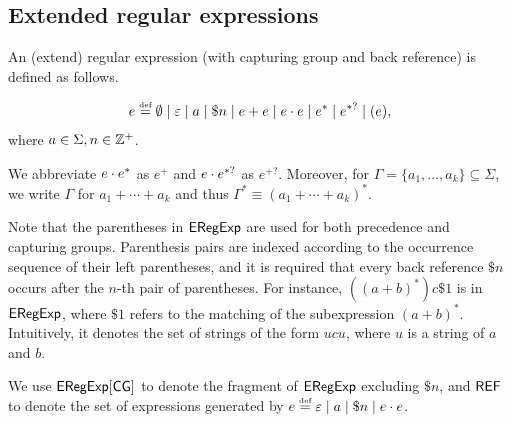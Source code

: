   
 \subsection{Extended regular expressions}
An (extend) regular expression (with capturing group and back reference) is defined as follows.
  
\begin{definition}
  	\[e \eqdef \emptyset \mid \varepsilon \mid a \mid \$n \mid e + e \mid e \concat e \mid e^* \mid e^{*?} \mid (e)  , \]
  	where $a \in \Sigma, n \in \mathbb{Z}^+$. 
\end{definition}
We abbreviate $e \cdot e^*$ as $e^+$ and $e \cdot e^{*?}$ as $e^{+?}$. Moreover, for $\Gamma = \{a_1, \ldots, a_k\}\subseteq \Sigma$, we write $\Gamma$ for  $a_1 + \cdots + a_k$ and thus  $\Gamma^\ast \equiv (a_1 + \cdots + a_k)^\ast$. 

Note that the parentheses in ${\sf ERegExp}$ are used for both precedence and capturing groups. 
%
Parenthesis pairs are indexed according to the occurrence sequence of their left parentheses, and it is required that every back reference $\$ n$ occurs  %
after the $n$-th pair of parentheses. For instance, $((a+b)^*) c \$1$ is in ${\sf ERegExp}$, where $\$1$ refers to the matching of the subexpression $(a+b)^*$. Intuitively, it denotes the set of strings of the form $u c u$, where $u$ is a string of $a$ and $b$. 
  
We use ${\sf ERegExp}[\sf CG]$ to denote the fragment of ${\sf ERegExp}$  excluding $\$ n$, and ${\sf REF}$ to denote the set of expressions generated by $e \eqdef \varepsilon \mid a \mid \$n \mid e \concat e$.
  
  
  
  
  
